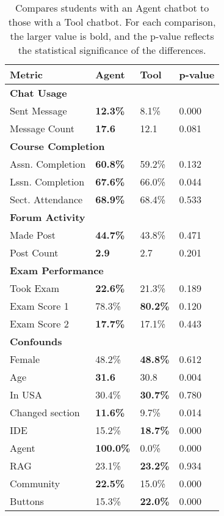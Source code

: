\begin{table}
\centering
\begin{tabularx}{\columnwidth}{l X X X}
\toprule
\textbf{Metric} & \textbf{Agent} & \textbf{Tool} & \textbf{p-value} \\
\midrule
\multicolumn{4}{l}{\textbf{Chat Usage}} \\
Sent Message & \textbf{12.3\%} & 8.1\% & 0.000 \\
Message Count & \textbf{17.6} & 12.1 & 0.081 \\
\midrule
\multicolumn{4}{l}{\textbf{Course Completion}} \\
Assn. Completion & \textbf{60.8\%} & 59.2\% & 0.132 \\
Lssn. Completion & \textbf{67.6\%} & 66.0\% & 0.044 \\
Sect. Attendance & \textbf{68.9\%} & 68.4\% & 0.533 \\
\midrule
\multicolumn{4}{l}{\textbf{Forum Activity}} \\
Made Post & \textbf{44.7\%} & 43.8\% & 0.471 \\
Post Count & \textbf{2.9} & 2.7 & 0.201 \\
\midrule
\multicolumn{4}{l}{\textbf{Exam Performance}} \\
Took Exam & \textbf{22.6\%} & 21.3\% & 0.189 \\
Exam Score 1 & 78.3\% & \textbf{80.2\%} & 0.120 \\
Exam Score 2 & \textbf{17.7\%} & 17.1\% & 0.443 \\
\midrule
\multicolumn{4}{l}{\textbf{Confounds}} \\
Female & 48.2\% & \textbf{48.8\%} & 0.612 \\
Age & \textbf{31.6} & 30.8 & 0.004 \\
In USA & 30.4\% & \textbf{30.7\%} & 0.780 \\
Changed section & \textbf{11.6\%} & 9.7\% & 0.014 \\
IDE & 15.2\% & \textbf{18.7\%} & 0.000 \\
Agent & \textbf{100.0\%} & 0.0\% & 0.000 \\
RAG & 23.1\% & \textbf{23.2\%} & 0.934 \\
Community & \textbf{22.5\%} & 15.0\% & 0.000 \\
Buttons & 15.3\% & \textbf{22.0\%} & 0.000 \\
\bottomrule
\end{tabularx}
\caption{Compares students with an Agent chatbot to those with a Tool chatbot. For each comparison, the larger value is bold, and the p-value reflects the statistical significance of the differences.}
\label{tab:personification-table-complete}
\end{table}